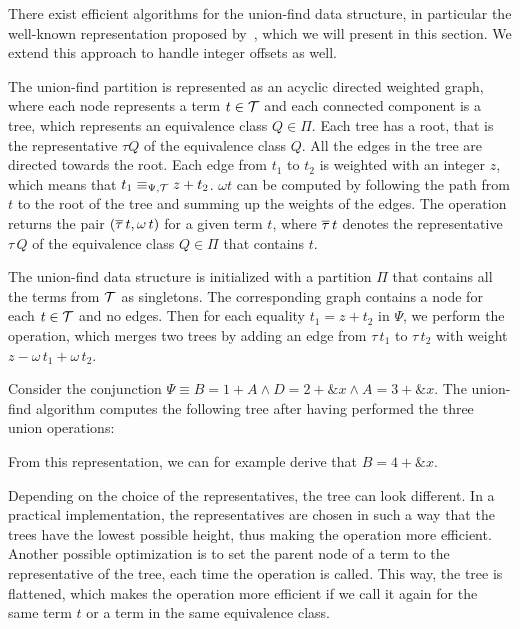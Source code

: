 There exist efficient algorithms for the union-find data structure,
in particular the well-known representation proposed by~\textcite{uf-tarjan},
which we will present in this section.
We extend this approach to handle integer offsets as well.

The union-find partition is represented as an acyclic directed weighted graph,
where each node represents a term $t \in \mathcal{T}$ and
each connected component is a tree, which represents an equivalence class $Q \in \Pi$.
Each tree has a root, that is the representative $\tau Q$ of the equivalence class $Q$.
All the edges in the tree are directed towards the root.
Each edge from $t_1$ to $t_2$ is weighted with an integer $z$,
which means that $t_1 \equiv_{\Psi,\mathcal{T}} z + t_2$.
$\omega t$ can be computed by following the path from $t$ to the root of the tree and summing up the weights of the edges.
The  operation returns the pair $(\overline{\tau}\,t, \omega\,t)$ for a given term $t$,
where $\overline{\tau}\,t$ denotes the representative $\tau\,Q$ of the equivalence class $Q\in\Pi$ that contains $t$.

The union-find data structure is initialized with a partition $\Pi$ that contains all the terms from $\mathcal{T}$ as singletons.
The corresponding graph contains a node for each $t \in \mathcal{T}$ and no edges.
Then for each equality $t_1 = z + t_2$ in $\Psi$, we perform the  operation, which merges two trees by adding an edge from $\tau\,t_1$ to $\tau\,t_2$ with weight $z - \omega\,t_1 + \omega\,t_2$.

\begin{example}
Consider the conjunction $\Psi \equiv B = 1 + A \land D = 2 + \&x \land A = 3 + \&x$.
The union-find algorithm computes the following tree after having performed the three union operations:


From this representation, we can for example derive that $B = 4 + \&x$.

Depending on the choice of the representatives, the tree can look different.
In a practical implementation, the representatives are chosen in such a way that the trees have the lowest possible height,
thus making the  operation more efficient.
Another possible optimization is to set the parent node of a term to the representative of the tree,
each time the  operation is called.
This way, the tree is flattened, which makes the  operation
more efficient if we call it again for the same term $t$ or a term in the same equivalence class.
\end{example}

